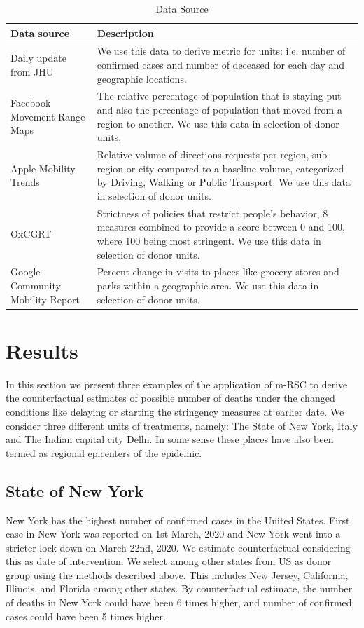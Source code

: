 \documentclass[final,authoryear,5p,times,twocolumn]{elsarticle}
\begin{document}
	\begin{table}
		\centering
		\begin{tabularx}{0.9\textwidth}[t]{p{}X}
			\hline
			\textbf{Data source} &  \textbf{Description}\\ [0.5ex]
			\hline\hline
			Daily update from JHU  \cite{DDG2020}  & We use this data to derive metric for units: i.e. number of confirmed cases and number of deceased for each day and geographic locations.\\ [1ex]
			\hline
			Facebook Movement Range Maps \cite{JM2020} & The relative percentage of population that is staying put and also the percentage of population that moved from a region to another. We use this data in selection of donor units.\\
			\hline
			Apple Mobility Trends\cite{Apple2020} & Relative volume of directions requests per region, sub-region or city compared to a baseline volume, categorized by Driving, Walking or Public Transport. We use this data in selection of donor units.\\
			\hline
			OxCGRT  \cite{HWP2020} &  Strictness of policies that restrict people’s behavior, 8 measures combined to provide a score between 0 and 100, where 100 being most stringent. We use this data in selection of donor units.\\
			\hline
			Google Community Mobility Report \cite{Goog2020} &  Percent change in visits to places like grocery stores and parks within a geographic area. We use this data in selection of donor units.\\ [1ex] 
			\hline
		\end{tabularx}
		\caption{Data Source}
		\label{Table1}
	\end{table}
	 
\section{Results}
\label{SEC4}
In this section we present three examples of the application of m-RSC to derive the counterfactual estimates of possible number of deaths under the changed conditions like delaying or starting the stringency measures at earlier date. We consider three different units of treatments, namely: The State of New York, Italy and The Indian capital city Delhi. In some sense these places have also been termed as regional epicenters  of the epidemic.

	\subsection{State of New York}
	New York has the highest number of confirmed cases in the United States. First case in New York was reported on 1st March, 2020 and New York went into a stricter lock-down on March 22nd, 2020. We estimate counterfactual considering this as date of intervention. We select among other states from US as donor group using the methods described above. This includes New Jersey, California, Illinois, and Florida among other states. By counterfactual estimate, the number of deaths in New York could have been 6 times higher, and number of confirmed cases could have been 5 times higher.
	
\end{document}
